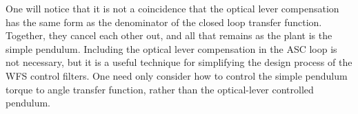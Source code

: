 One will notice that it is not a coincidence that the optical lever compensation has the same form as the denominator of the closed loop transfer function. Together, they cancel each other out, and all that remains as the plant is the simple pendulum. Including the optical lever compensation in the ASC loop is not necessary, but it is a useful technique for simplifying the design process of the WFS control filters. One need only consider how to control the simple pendulum torque to angle transfer function, rather than the optical-lever controlled pendulum.




\begin{figure} \begin{centering}  

\end{centering}
\end{figure}
